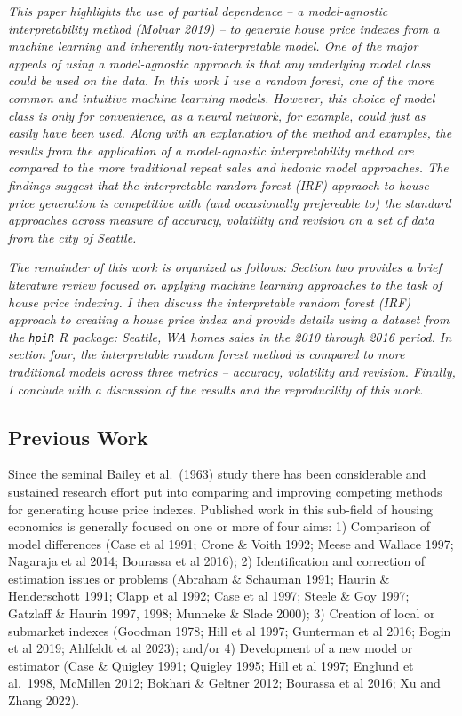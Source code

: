 \documentclass[
]{article}
\begin{document}
\emph{This paper highlights the use of partial dependence -- a
model-agnostic interpretability method (Molnar 2019) -- to generate
house price indexes from a machine learning and inherently
non-interpretable model. One of the major appeals of using a
model-agnostic approach is that any underlying model class could be used
on the data. In this work I use a random forest, one of the more common
and intuitive machine learning models. However, this choice of model
class is only for convenience, as a neural network, for example, could
just as easily have been used. Along with an explanation of the method
and examples, the results from the application of a model-agnostic
interpretability method are compared to the more traditional repeat
sales and hedonic model approaches. The findings suggest that the
interpretable random forest (IRF) appraoch to house price generation is
competitive with (and occasionally prefereable to) the standard
approaches across measure of accuracy, volatility and revision on a set
of data from the city of Seattle. }

\emph{The remainder of this work is organized as follows: Section two
provides a brief literature review focused on applying machine learning
approaches to the task of house price indexing. I then discuss the
interpretable random forest (IRF) approach to creating a house price
index and provide details using a dataset from the \texttt{hpiR} R
package: Seattle, WA homes sales in the 2010 through 2016 period. In
section four, the interpretable random forest method is compared to more
traditional models across three metrics -- accuracy, volatility and
revision. Finally, I conclude with a discussion of the results and the
reproducility of this work. }

\hypertarget{previous-work}{%
\subsection{Previous Work}\label{previous-work}}

Since the seminal Bailey et al.~(1963) study there has been considerable
and sustained research effort put into comparing and improving competing
methods for generating house price indexes. Published work in this
sub-field of housing economics is generally focused on one or more of
four aims: 1) Comparison of model differences (Case et al 1991; Crone \&
Voith 1992; Meese and Wallace 1997; Nagaraja et al 2014; Bourassa et al
2016); 2) Identification and correction of estimation issues or problems
(Abraham \& Schauman 1991; Haurin \& Henderschott 1991; Clapp et al
1992; Case et al 1997; Steele \& Goy 1997; Gatzlaff \& Haurin 1997,
1998; Munneke \& Slade 2000); 3) Creation of local or submarket indexes
(Goodman 1978; Hill et al 1997; Gunterman et al 2016; Bogin et al 2019;
Ahlfeldt et al 2023); and/or 4) Development of a new model or estimator
(Case \& Quigley 1991; Quigley 1995; Hill et al 1997; Englund et
al.~1998, McMillen 2012; Bokhari \& Geltner 2012; Bourassa et al 2016;
Xu and Zhang 2022).
\end{document}
